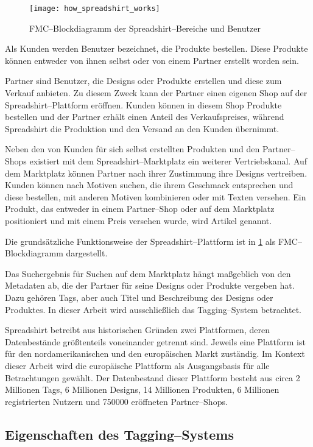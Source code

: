 \begin{figure}
\centering
\texttt{[image: how\_spreadshirt\_works]}
\caption{FMC--Blockdiagramm der Spreadshirt--Bereiche und Benutzer}
\label{fig:howspreadshirtworks}
\end{figure}

Als Kunden werden Benutzer bezeichnet, die Produkte bestellen. Diese Produkte können entweder von ihnen selbst oder von einem Partner erstellt worden sein. 

Partner sind Benutzer, die Designs oder Produkte erstellen und diese zum Verkauf anbieten. Zu diesem Zweck kann der Partner einen eigenen Shop auf der Spreadshirt--Plattform eröffnen. Kunden können in diesem Shop Produkte bestellen und der Partner erhält einen Anteil des Verkaufspreises, während Spreadshirt die Produktion und den Versand an den Kunden übernimmt.

Neben den von Kunden für sich selbst erstellten Produkten und den Partner--Shops existiert mit dem Spreadshirt--Marktplatz ein weiterer Vertriebskanal. Auf dem Marktplatz können Partner nach ihrer Zustimmung ihre Designs vertreiben. Kunden können nach Motiven suchen, die ihrem Geschmack entsprechen und diese bestellen, mit anderen Motiven kombinieren oder mit Texten versehen. Ein Produkt, das entweder in einem Partner--Shop oder auf dem Marktplatz positioniert und mit einem Preis versehen wurde, wird Artikel genannt.

Die grundsätzliche Funktionsweise der Spreadshirt--Plattform ist in \cref{fig:howspreadshirtworks} als FMC--Blockdiagramm dargestellt.

Das Suchergebnis für Suchen auf dem Marktplatz hängt maßgeblich von den Metadaten ab, die der Partner für seine Designs oder Produkte vergeben hat. Dazu gehören Tags, aber auch Titel und Beschreibung des Designs oder Produktes. In dieser Arbeit wird ausschließlich das Tagging--System betrachtet.

\label{platforms}
Spreadshirt betreibt aus historischen Gründen zwei Plattformen, deren Datenbestände größtenteils voneinander getrennt sind. Jeweils eine Plattform ist für den nordamerikanischen und den europäischen Markt zuständig. Im Kontext dieser Arbeit wird die europäische Plattform als Ausgangsbasis für alle Betrachtungen gewählt. Der Datenbestand dieser Plattform besteht aus circa 2 Millionen Tags, 6 Millionen Designs, 14 Millionen Produkten, 6 Millionen registrierten Nutzern und \num{750000} eröffneten Partner--Shops.

\subsection{Eigenschaften des Tagging--Systems}
\label{tag_sprd}

